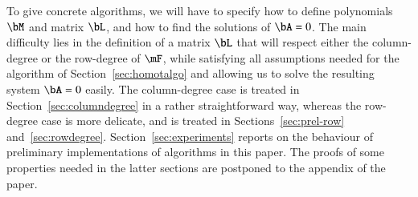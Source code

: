To give concrete algorithms, we will have to specify how to define
polynomials $\bM$ and matrix $\bL$, and how to find the solutions of 
$\bA=0$.
The main difficulty lies in the definition of a matrix
$\bL$ that will respect either the column-degree or the row-degree of
$\mF$, while satisfying all assumptions needed for the algorithm of
Section~\ref{sec:homotalgo} and allowing us to solve
the resulting system $\bA=0$ easily.
  The column-degree case is treated in
Section~\ref{sec:columndegree} in a rather straightforward way,
whereas the row-degree case is more delicate, and is treated in
Sections~\ref{sec:prel-row} and~\ref{sec:rowdegree}.
Section~\ref{sec:experiments} reports on the behaviour of preliminary
implementations of algorithms in this paper. The proofs of
some properties needed in the latter sections are postponed to the
appendix of the paper.






